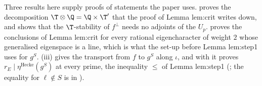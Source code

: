Three results here supply proofs of statements the paper uses.  proves the decomposition $\T\otimes\Q=\Q\times\T'$ that the proof of Lemma lem:crit writes down, and shows
that the $\T$-stability of $f^\perp$ needs no adjoints of the $U_p$.  proves the conclusions of Lemma lem:crit for every rational eigencharacter of weight $2$ whose generalised eigenspace is a line,
which is what the set-up before Lemma lem:step1 uses for $g^S$. (iii) gives the transport from $f$ to $g^S$ along $\iota$, and with it
 proves $r_E\mid\eta^{\mathrm{Hecke}}(g^S)$ at every prime, the inequality $\le$ of Lemma lem:step1 (; the equality for $\ell\notin S$ is in ).
